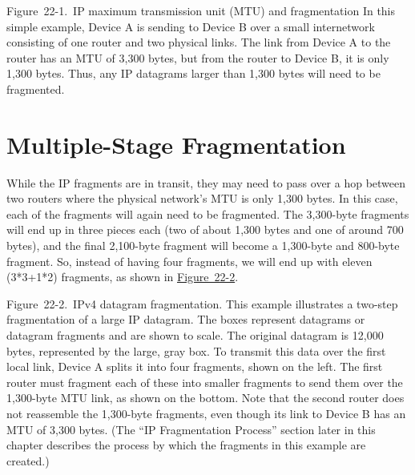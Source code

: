 \protect\hypertarget{ch22.htmlux5cux23ip_maximum_transmission_unit_mtu_and_fra}{}{}

\protect\hypertarget{ch22.htmlux5cux23I_mediaobject8_d1e23789}{}{}

Figure~22-1.~IP maximum transmission unit (MTU) and fragmentation In
this simple example, Device A is sending to Device B over a small
internetwork consisting of one router and two physical links. The link
from Device A to the router has an MTU of 3,300 bytes, but from the
router to Device B, it is only 1,300 bytes. Thus, any IP datagrams
larger than 1,300 bytes will need to be fragmented.



\section{Multiple-Stage Fragmentation}

While the \protect\hypertarget{ch22.htmlux5cux23idx-CHP-22-0802}{}{}IP
fragments are in transit, they may need to pass over a hop between two
routers where the physical network's MTU is only 1,300 bytes. In this
case, each of the fragments will again need to be fragmented. The
3,300-byte fragments will end up in three pieces each (two of about
1,300 bytes and one of around 700 bytes), and the final 2,100-byte
fragment will become a 1,300-byte and 800-byte fragment. So, instead of
having four fragments, we will end up with eleven (3*3+1*2) fragments,
as shown in
\protect\hyperlink{ch22.htmlux5cux23ipv4_datagram_fragmentation_this_example}{Figure~22-2}.

\protect\hypertarget{ch22.htmlux5cux23ipv4_datagram_fragmentation_this_example}{}{}

\protect\hypertarget{ch22.htmlux5cux23I_mediaobject8_d1e23810}{}{}

Figure~22-2.~IPv4 datagram fragmentation. This example illustrates a
two-step fragmentation of a large IP datagram. The boxes represent
datagrams or datagram fragments and are shown to scale. The original
datagram is 12,000 bytes, represented by the large, gray box. To
transmit this data over the first local link, Device A splits it into
four fragments, shown on the left. The first router must fragment each
of these into smaller fragments to send them over the 1,300-byte MTU
link, as shown on the bottom. Note that the second router does not
reassemble the 1,300-byte fragments, even though its link to Device B
has an MTU of 3,300 bytes. (The ``IP Fragmentation Process'' section later
in this chapter describes the process by which the fragments in this
example are created.)



